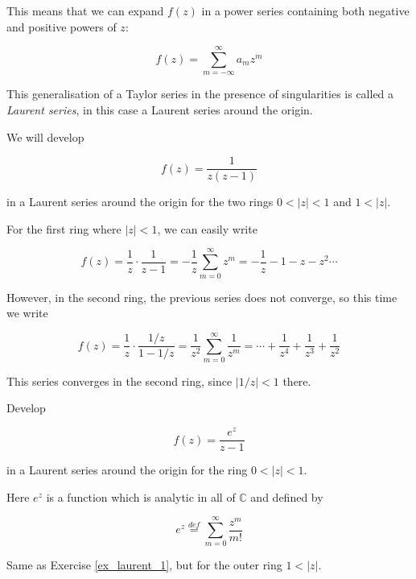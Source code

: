 This means that we can expand $f(z)$ in a power series containing both negative
and positive powers of $z$:

\begin{equation}
f(z)= \sum_{m=-\infty}^{\infty} a_m z^m
\end{equation} 

This generalisation of a Taylor series in the presence of singularities is
called a \emph{Laurent series}, in this case a Laurent series around the origin.

\begin{sidebar}
\begin{exa}
We will develop

$$f(z)=\frac{1}{z(z-1)}$$

in a Laurent series around the origin for the two rings $0 < | z | < 1$ and $ 1 < |z|$.

For the first ring where $| z | < 1$, we can easily write

$$f(z)=\frac{1}{z} \cdot \frac{1}{z-1} = -\frac{1}{z} \sum_{m=0}^{\infty} z^m =-\frac{1}{z}-1-z-z^2 \cdots$$

However, in the second ring, the previous series does not converge, so this time we write

$$f(z)=\frac{1}{z} \cdot \frac{1 / z }{1-1/z} = \frac{1}{z^2} \sum_{m=0}^{\infty} \frac{1}{z^m} =\cdots+\frac{1}{z^4}+\frac{1}{z^3} + \frac{1}{z^2}$$

This series converges in the second ring, since $|1/z| < 1$ there.
\end{exa}
\end{sidebar}

\begin{sidebar}
\begin{ex}
\label{ex_laurent_1}
Develop

$$f(z)=\frac{e^z}{z-1}$$

in a Laurent series around the origin for the ring $0 < | z | < 1$.

Here $e^z$ is a function which is analytic in all of $\mathbb{C}$ and defined by

$$e^z \stackrel{def}{=} \sum_{m=0}^{\infty} \frac{z^m}{m!} $$
\end{ex}
\end{sidebar}

\begin{sidebar}
\begin{ex}
Same as Exercise \ref{ex_laurent_1}, but for the outer ring  $1 < | z |$.
\end{ex}
\end{sidebar}

